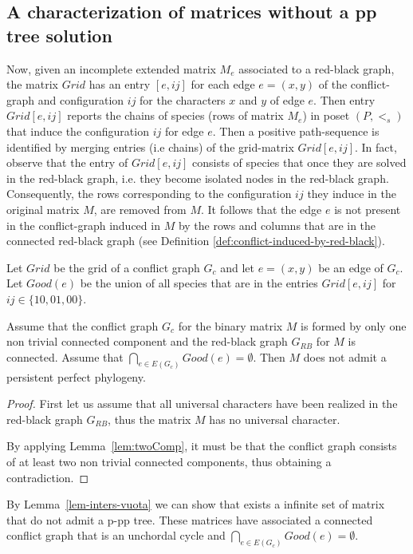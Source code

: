 \subsection*{A characterization of matrices without a pp tree solution}


Now, given
an incomplete extended matrix $M_e$ associated to a red-black graph,  the
matrix $Grid$  has an entry $ [e, ij]$ for each edge $e= (x,y)$ of the
conflict-graph  and configuration $ij$  for the characters $x$ and $y$ of edge
$e$. Then entry $Grid[e, ij]$ reports the chains of species (rows of matrix
$M_e$)  in poset $(P,<_s)$ that induce the configuration $ij$ for edge $e$.
Then a \initial positive path-sequence is identified by merging entries (i.e
chains) of the grid-matrix $Grid[e, ij]$.  In fact, observe that  the  entry of
$Grid[e, ij]$ consists of  species that once they are solved in the red-black
graph, i.e. they become isolated nodes in the red-black graph. Consequently,
the rows corresponding to  the configuration $ij$
they induce in the original matrix $M$, are  removed from $M$. It follows that
the edge $e$ is not present in the  conflict-graph induced in $M$ by the rows
and columns
that are in the connected red-black graph (see Definition
\ref{def:conflict-induced-by-red-black}).


Let  $Grid$ be the grid of a conflict graph $G_{c}$ and  let $e=(x,y)$ be an
edge of $G_{c}$.
Let $Good(e)$  be  the union of all species that are in the entries
$Grid[e,ij]$ for $ij \in \{10,01,00\} $.
\begin{lemma}\label{lem-inters-vuota}
  Assume that the conflict  graph  $G_c$   for the binary matrix $M$ is formed
by only one non trivial connected component and the red-black graph $G_{RB}$
for $M$ is connected. Assume that
  $\bigcap_{e \in E(G_c)} Good(e) = \emptyset$.
  Then $M$ does not admit a persistent perfect phylogeny.
\end{lemma}
\begin{proof}
  First let us assume that all universal characters have been realized in the
red-black graph $G_{RB}$, thus the matrix $M$ has no universal character.

  By applying Lemma~\ref{lem:twoComp}, it must be that the conflict graph
consists
  of at least two non trivial connected components, thus obtaining a
contradiction.


\end{proof}



By Lemma~\ref{lem-inters-vuota} we can show that exists a infinite set of
matrix that do not admit a p-pp tree. These matrices have associated a
connected conflict graph that is an unchordal cycle and $\bigcap_{e \in E(G_c)}
Good(e) = \emptyset$.


